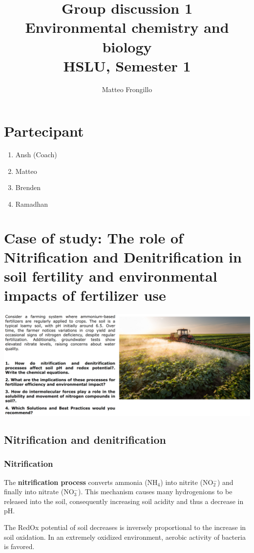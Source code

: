 \documentclass{article}
\title{\textbf{Group discussion 1 \\ Environmental chemistry and biology \\ HSLU, Semester 1}}
\author{Matteo Frongillo}
\begin{document}
\maketitle
\tableofcontents
\pagebreak

\section{Partecipant}
\begin{enumerate}
    \item Ansh (Coach)
    \item Matteo
    \item Brenden
    \item Ramadhan
\end{enumerate}

\section{Case of study: The role of Nitrification and Denitrification in soil fertility
and environmental impacts of fertilizer use}
\includegraphics[width=\textwidth]{media1/SW04.png}

\subsection{Nitrification and denitrification}
\subsubsection{Nitrification}
The \textbf{nitrification process} converts ammonia (NH$_4$) into nitrite (NO$_2^-$) and finally
into nitrate (NO$_3^-$). This mechanism causes many hydrogenions to be released into the
soil, consequently increasing soil acidity and thus a decrease in pH.

The RedOx potential of soil decreases is inversely proportional to the increase in soil
oxidation. In an extremely oxidized environment, aerobic activity of bacteria is favored.
\end{document}
